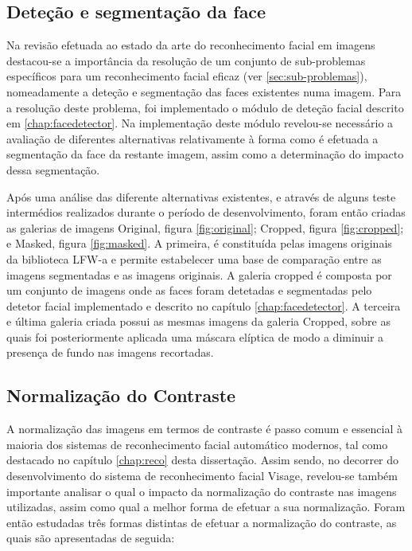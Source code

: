 \subsection{Deteção e segmentação da face}
Na revisão efetuada ao estado da arte do reconhecimento facial em imagens destacou-se a importância da resolução de um conjunto de sub-problemas específicos para um reconhecimento facial eficaz (ver \ref{sec:sub-problemas}), nomeadamente a deteção e segmentação das faces existentes numa imagem. Para a resolução deste problema, foi implementado o módulo de deteção facial descrito em \ref{chap:facedetector}. Na implementação deste módulo revelou-se necessário a avaliação de diferentes alternativas relativamente à forma como é efetuada a segmentação da face da restante imagem, assim como a determinação do impacto dessa segmentação. 

Após uma análise das diferente alternativas existentes, e através de alguns teste intermédios realizados durante o período de desenvolvimento, foram então criadas as galerias de imagens Original, figura \ref{fig:original}; Cropped, figura \ref{fig:cropped}; e Masked, figura \ref{fig:masked}. A primeira, é constituída pelas imagens originais da biblioteca LFW-a e permite estabelecer uma base de comparação entre as imagens segmentadas e as imagens originais. A galeria cropped é composta por um conjunto de imagens onde as faces foram detetadas e segmentadas pelo detetor facial implementado e descrito no capítulo \ref{chap:facedetector}. A terceira e última galeria criada possui as mesmas imagens da galeria Cropped, sobre as quais foi posteriormente aplicada uma máscara elíptica de modo a diminuir a presença de fundo nas imagens recortadas.

\subsection{Normalização do Contraste}
A normalização das imagens em termos de contraste é passo comum e essencial à maioria dos sistemas de reconhecimento facial automático modernos, tal como destacado no capítulo \ref{chap:reco} desta dissertação. Assim sendo, no decorrer do desenvolvimento do sistema de reconhecimento facial Visage, revelou-se também importante analisar o qual o impacto da normalização do contraste nas imagens utilizadas, assim como qual a melhor forma de efetuar a sua normalização. Foram então estudadas três formas distintas de efetuar a normalização do contraste, as quais são apresentadas de seguida:

